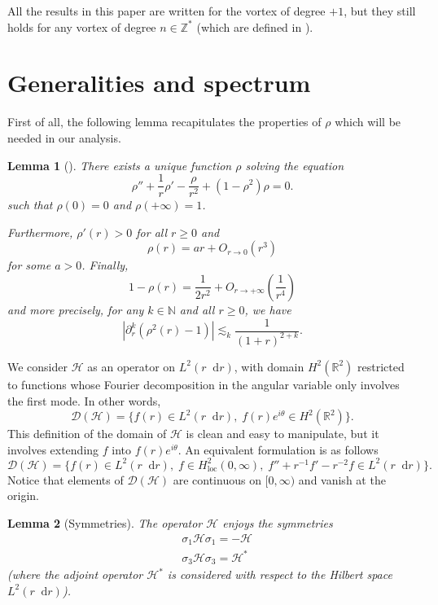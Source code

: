 \documentclass[11 pt]{amsart}
\newtheorem{lem}{Lemma}[section]
\theoremstyle{definition}
\theoremstyle{remark}
\numberwithin{equation}{section}
\newcommand{\dd}{\mathop{}\!\mathrm{d}}
\begin{document}
All the results in this paper are written for the vortex of degree $+1$, but they still holds for any vortex of degree $n \in \mathbb{Z}^\ast$ (which are defined in \cite{HerveHerve}).


\section{Generalities and spectrum}

\label{sectiongeneralities}

First of all, the following lemma recapitulates the properties of $\rho$ which will be needed in our analysis.

\begin{lem}[\cite{HerveHerve}]
  \label{rhostuff}
There exists a unique function $\rho$ solving the equation
  \[ \rho'' + \frac{1}{r} \rho' - \frac{\rho}{r^2} + (1 - \rho^2) \rho = 0. \]
such that $\rho(0)=0$ and $\rho(+\infty)=1$.

Furthermore, $\rho' (r) > 0$ for all $r \geqslant 0$ and
  \[ \rho (r) = a r + O_{r \rightarrow 0} (r^3) \]
  for some $a > 0$. Finally,
  \[ 1 - \rho (r) = \frac{1}{2 r^2} + O_{r \rightarrow + \infty} \left(
     \frac{1}{r^4} \right) \]
  and more precisely, for any $k \in \mathbb{N}$ and all $r \geqslant 0$, we
  have
  \[ | \partial_r^k (\rho^2 (r) - 1) | \lesssim_k \frac{1}{(1 + r)^{2 + k}} .
  \]
\end{lem}


We consider $\mathcal{H}$ as an operator on $L^2(r \dd r)$, with domain $H^2(\mathbb{R}^2)$ restricted to functions whose Fourier decomposition in the angular variable only involves the first mode. In other words,
$$
\mathcal{D}(\mathcal{H}) = \{ f(r) \in L^2(r \dd r), \; f(r)e^{i\theta} \in H^2 (\mathbb{R}^2) \}.
$$
This definition of the domain of $\mathcal{H}$ is clean and easy to manipulate, but it involves extending $f$ into $f(r) e^{i\theta}$. An equivalent formulation is as follows
$$
\mathcal{D}(\mathcal{H}) = \{ f(r) \in L^2(r \dd r), \; f \in H^2_{\operatorname{loc}}(0,\infty), \; f''+r^{-1}f'-r^{-2}f \in L^2(r \dd r) \}.
$$
Notice that elements of $\mathcal{D}(\mathcal{H})$ are continuous on $[0,\infty)$ and vanish at the origin.

\begin{lem}[Symmetries]
The operator $\mathcal{H}$ enjoys the symmetries
\begin{equation}
\label{symmetryH}
\begin{split}
& \sigma_1 \mathcal{H} \sigma_1 = - \mathcal{H} \\
& \sigma_3 \mathcal{H} \sigma_3 = \mathcal{H}^*
\end{split}
\end{equation}
(where the adjoint operator $\mathcal{H}^*$ is considered with respect to the Hilbert space $L^2(r \dd r)$).
\end{lem}
\end{document}
